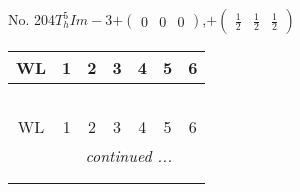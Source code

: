 \documentclass[fleqn,9pt,landscape]{jsarticle}
\begin{document}
\newpage
No. 204\quad$T_{h}^{5}$\quad$Im-3$\quad[ cubic ]\quad$+\begin{pmatrix} 0 & 0 & 0 \end{pmatrix}$,\quad $+\begin{pmatrix} \frac{1}{2} & \frac{1}{2} & \frac{1}{2} \end{pmatrix}$
\begin{center}
\renewcommand{\arraystretch}{1.2}
\begin{longtable}{ccccccc}
 \hline \hline
WL & 1 & 2 & 3 & 4 & 5 & 6 \\ \hline \endfirsthead

\multicolumn{6}{l}{\tablename\ \thetable{}} \\
 \hline \hline
WL & 1 & 2 & 3 & 4 & 5 & 6 \\ \hline \endhead

 \hline \hline
\multicolumn{6}{r}{\footnotesize\it continued ...} \\ \endfoot

 \hline \hline
\multicolumn{6}{r}{} \\ \endlastfoot


\end{longtable}
\end{center}
\end{document}
